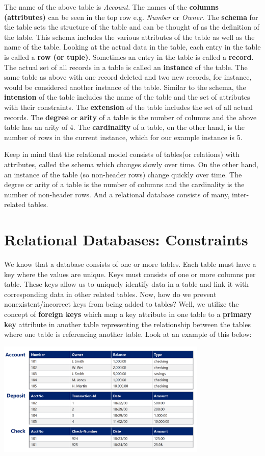 \documentclass{article}
\begin{document}
The name of the above table is \textit{Account}. The names of the \textbf{columns (attributes)} can be seen in the top row e.g. \textit{Number} or \textit{Owner}. The \textbf{schema} for the table sets the structure of the table and can be thought of as the definition of the table. This schema includes the various attributes of the table as well as the name of the table. Looking at the actual data in the table, each entry in the table is called a \textbf{row (or tuple)}. Sometimes an entry in the table is called a \textbf{record}. The actual set of all records in a table is called an \textbf{instance} of the table. The same table as above with one record deleted and two new records, for instance, would be considered another instance of the table. Similar to the schema, the \textbf{intension} of the table includes the name of the table and the set of attributes with their constraints. The \textbf{extension} of the table includes the set of all actual records. The \textbf{degree} or \textbf{arity} of a table is the number of columns and the above table has an arity of 4. The \textbf{cardinality} of a table, on the other hand, is the number of rows in the current instance, which for our example instance is 5.

Keep in mind that the relational model consists of tables(or relations) with attributes, called the schema which changes slowly over time. On the other hand, an instance of the table (so non-header rows) change quickly over time. The degree or arity of a table is the number of columns and the cardinality is the number of non-header rows. And a relational database consists of many, inter-related tables.

\section*{Relational Databases: Constraints}
We know that a database consists of one or more tables. Each table must have a key where the values are unique. Keys must consists of one or more columns per table. These keys allow us to uniquely identify data in a table and link it with corresponding data in other related tables. Now, how do we prevent nonexistent/incorrect keys from being added to tables? Well, we utilize the concept of \textbf{foreign keys} which map a key attribute in one table to a \textbf{primary key} attribute in another table representing the relationship between the tables where one table is referencing another table. Look at an example of this below:

\includegraphics[width = 10cm]{assets/bankAccountsExample2.png}
\end{document}
